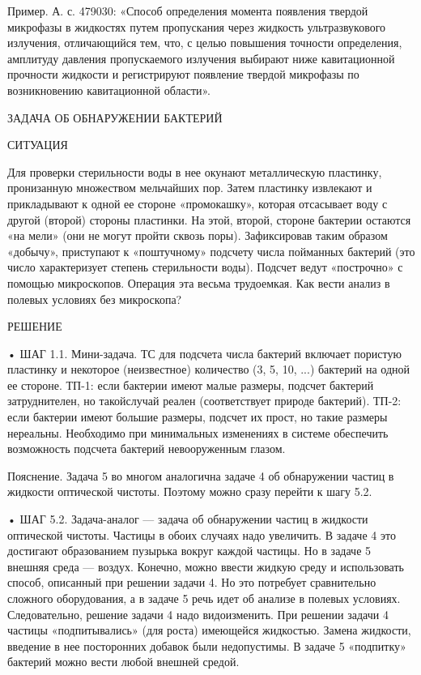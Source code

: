 Пример. А.  с. 479030:  «Способ определения момента  появления твердой
микрофазы в жидкостях путем пропускания через жидкость ультразвукового
излучения,  отличающийся   тем,  что,   с  целью   повышения  точности
определения, амплитуду давления  пропускаемого излучения выбирают ниже
кавитационной  прочности  жидкости  и регистрируют  появление  твердой
микрофазы по возникновению кавитационной области».


ЗАДАЧА ОБ ОБНАРУЖЕНИИ БАКТЕРИЙ

СИТУАЦИЯ

Для проверки стерильности воды  в нее окунают металлическую пластинку,
пронизанную  множеством мельчайших  пор. Затем  пластинку извлекают  и
прикладывают к одной ее  стороне «промокашку», которая отсасывает воду
с другой (второй) стороны пластинки. На этой, второй, стороне бактерии
остаются «на  мели» (они  не могут  пройти сквозь  поры). Зафиксировав
таким  образом  «добычу»,  приступают к  «поштучному»  подсчету  числа
пойманных  бактерий  (это  число  характеризует  степень  стерильности
воды). Подсчет  ведут «построчно» с помощью  микроскопов. Операция эта
весьма трудоемкая. Как вести анализ в полевых условиях без микроскопа?

РЕШЕНИЕ

•  ШАГ  1.1. Мини-задача.  ТС  для  подсчета числа  бактерий  включает
пористую  пластинку и  некоторое (неизвестное)  количество (3,  5, 10,
...)  бактерий  на  одной  ее   стороне.  ТП-1:  если  бактерии  имеют
малые размеры,  подсчет бактерий затруднителен, но  такойслучай реален
(соответствует природе  бактерий). ТП-2:  если бактерии  имеют большие
размеры, подсчет их прост, но  такие размеры нереальны. Необходимо при
минимальных  изменениях  в  системе  обеспечить  возможность  подсчета
бактерий невооруженным глазом.

Пояснение.  Задача 5  во  многом аналогична  задаче  4 об  обнаружении
частиц в  жидкости оптической чистоты.  Поэтому можно сразу  перейти к
шагу 5.2.

• ШАГ  5.2. Задача-аналог  — задача об  обнаружении частиц  в жидкости
оптической чистоты. Частицы в обоих случаях надо увеличить. В задаче 4
это достигают образованием пузырька вокруг каждой частицы. Но в задаче
5  внешняя  среда —  воздух.  Конечно,  можно  ввести жидкую  среду  и
использовать способ, описанный при решении  задачи 4. Но это потребует
сравнительно сложного оборудования, а в  задаче 5 речь идет об анализе
в полевых условиях. Следовательно, решение задачи 4 надо видоизменить.
При  решении задачи  4 частицы  «подпитывались» (для  роста) имеющейся
жидкостью. Замена  жидкости, введение  в нее посторонних  добавок были
недопустимы. В задаче 5 «подпитку»  бактерий можно вести любой внешней
средой.

